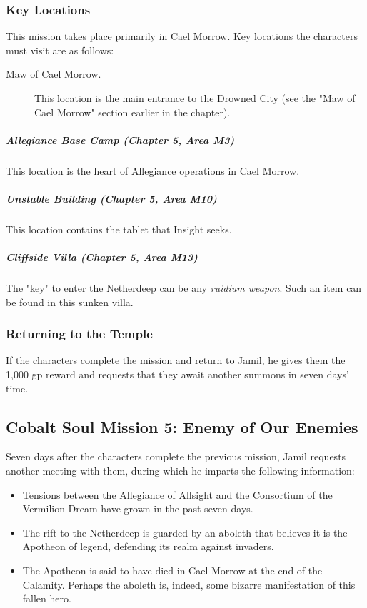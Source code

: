 \documentclass[10pt,a4paper,twoside,fancy,bg=print,twocolumn,openany,nodeprecatedcode]{dndbook}
\begin{document}
\subsubsection{Key Locations}
This mission takes place primarily in Cael Morrow. Key locations the characters must visit are as follows:


\begin{description}
\item[Maw of Cael Morrow.]
This location is the main entrance to the Drowned City (see the "Maw of Cael Morrow" section earlier in the chapter).
\end{description}

\subparagraph{Allegiance Base Camp (Chapter 5, Area M3)}
This location is the heart of Allegiance operations in Cael Morrow.

\subparagraph{Unstable Building (Chapter 5, Area M10)}
This location contains the tablet that Insight seeks.

\subparagraph{Cliffside Villa (Chapter 5, Area M13)}
The "key" to enter the Netherdeep can be any \textit{ruidium weapon}. Such an item can be found in this sunken villa.

\subsubsection{Returning to the Temple}
If the characters complete the mission and return to Jamil, he gives them the 1,000 gp reward and requests that they await another summons in seven days' time.

\subsection{Cobalt Soul Mission 5: Enemy of Our Enemies}
Seven days after the characters complete the previous mission, Jamil requests another meeting with them, during which he imparts the following information:


\begin{itemize}
\item Tensions between the Allegiance of Allsight and the Consortium of the Vermilion Dream have grown in the past seven days.
\item The rift to the Netherdeep is guarded by an aboleth that believes it is the Apotheon of legend, defending its realm against invaders.
\item The Apotheon is said to have died in Cael Morrow at the end of the Calamity. Perhaps the aboleth is, indeed, some bizarre manifestation of this fallen hero.
\end{itemize}
\end{document}
